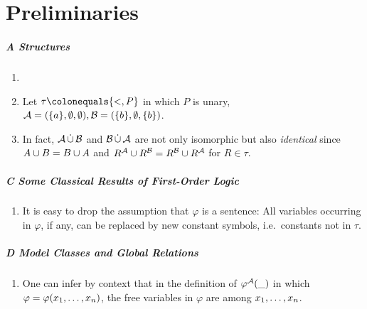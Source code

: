 \chapter{Preliminaries}
\paragraph{A Structures}
\begin{enumerate}[1.]
%
\item {}
%
\item {} Let $\tau \defas \sete{{<}, P}$ in which $P$ is unary, $\mathcal{A} = ({\{a\}}, \emptyset, \emptyset), \mathcal{B} = ({\{b\}}, \emptyset, {\{b\}})$.
%
\item {} In fact, $\mathcal{A} \mathop{\dot{\cup}} \mathcal{B}$ and $\mathcal{B} \mathop{\dot{\cup}} \mathcal{A}$ are not only isomorphic but also \emph{identical} since $A \cup B = B \cup A$ and $R^{\mathcal{A}} \cup R^{\mathcal{B}} = R^{\mathcal{B}} \cup R^{\mathcal{A}}$ for $R \in \tau$.
%
\end{enumerate}
\paragraph{C Some Classical Results of First-Order Logic}
\begin{enumerate}[1.]
%
\item {} It is easy to drop the assumption that $\varphi$ is a sentence: All variables occurring in $\varphi$, if any, can be replaced by new constant symbols, i.e.\ constants not in $\tau$.
%
\end{enumerate}
\paragraph{D Model Classes and Global Relations}
\begin{enumerate}[1.]
%
\item {} One can infer by context that in the definition of ${\varphi^{\mathcal{A}}(\_)}$ in which $\varphi = \varphi(x_1, \ldots, x_n)$, the free variables in $\varphi$ are among $x_1, \ldots, x_n$.
%
\end{enumerate}
